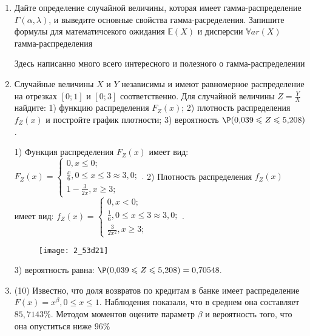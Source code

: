\documentclass[a4paper,12pt]{article}
\begin{document}
\begin{enumerate}


\item

Дайте определение случайной величины, которая имеет гамма-распределение $\Gamma(\alpha,  \lambda)$, и выведите основные свойства гамма-расределения. Запишите формулы для математичсекого ожидания
$\mathbb{E}(X)$ и дисперсии $\mathbb{V}ar(X)$ гамма-распределения




Здесь написанно много всего интересного и полезного о гамма-распределении


\item



Случайные величины $X$ и $Y$ независимы и имеют равномерное
распределение на отрезках $[0;1]$ и $[0;3]$ соответственно. Для случайной величины $Z=\frac{Y}{X}$ найдите: 
1) функцию распределения $F_Z(x)$;
2) плотность распределения $f_Z(x)$ и постройте график плотности;
3) вероятность $\P(0,\!039\leqslant Z\leqslant 5,\!208)$.




1) Функция распределения $F_Z(x)$ имеет вид:
$
F_Z(x)=\left\{
\begin{array}{l}
0, x\leqslant 0;\\
\frac{x}{6}, 0\leqslant x\leqslant 3\approx 3,\!0;\\
1 - \frac{3}{2 x}, x\geqslant3;
\end{array}.
\right.
$
2) Плотность распределения $f_Z(x)$ имеет вид:
$
f_Z(x)=\left\{
\begin{array}{l}
0, x<0;\\
\frac{1}{6}, 0\leqslant x\leqslant 3\approx 3,\!0;\\
\frac{3}{2 x^{2}}, x\geqslant3;
\end{array}.
\right.
$


\begin{figure}[H]
    \texttt{[image: 2\_53d21]}
\end{figure}


3) вероятность равна:
$
\P(0,\!039\leqslant Z\leqslant 5,\!208)=
0,\!70548.
$


\item


(10) Известно, что доля возвратов по кредитам в банке имеет распределение $F(x) = x ^{\beta}, 0 \leqslant x \leqslant 1$.
Наблюдения показали, что в среднем она составляет $85,7143\%$. Методом моментов оцените параметр $\beta$ и
вероятность того, что она опуститься ниже $96\%$





\end{enumerate}
\end{document}
